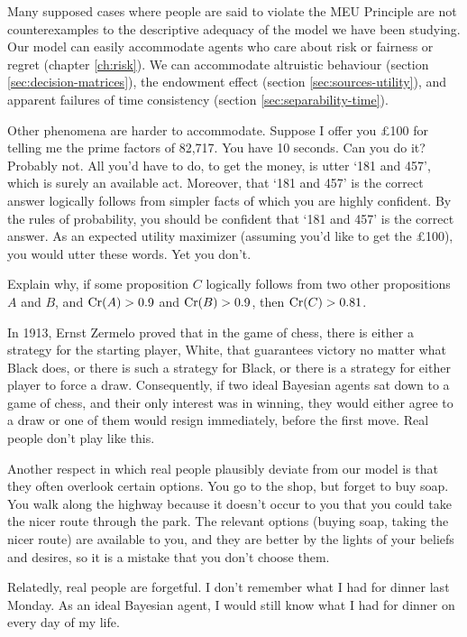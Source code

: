 Many supposed cases where people are said to violate the MEU Principle are not
counterexamples to the descriptive adequacy of the model we have been studying.
Our model can easily accommodate agents who care about risk or fairness or
regret (chapter \ref{ch:risk}). We can accommodate altruistic behaviour (section
\ref{sec:decision-matrices}), the endowment effect (section
\ref{sec:sources-utility}), and apparent failures of time consistency (section
\ref{sec:separability-time}).

Other phenomena are harder to accommodate. Suppose I offer you £100 for telling
me the prime factors of 82,717. You have 10 seconds. Can you do it? Probably
not. All you'd have to do, to get the money, is utter `181 and 457', which is
surely an available act. Moreover, that `181 and 457' is the correct answer
logically follows from simpler facts of which you are highly confident. By the
rules of probability, you should be confident that `181 and 457' is the correct
answer. As an expected utility maximizer (assuming you'd like to get the £100),
you would utter these words. Yet you don't.

\begin{exercise}{2}
  Explain why, if some proposition $C$ logically follows from two other
  propositions $A$ and $B$, and $\text{Cr}(A) > 0.9$ and $\text{Cr}(B) > 0.9$, then
  $\text{Cr}(C) > 0.81$.
\end{exercise}

In 1913, Ernst Zermelo proved that in the game of chess, there is either a
strategy for the starting player, White, that guarantees victory no matter what
Black does, or there is such a strategy for Black, or there is a strategy for
either player to force a draw. Consequently, if two ideal Bayesian agents sat
down to a game of chess, and their only interest was in winning, they would
either agree to a draw or one of them would resign immediately, before the first
move. Real people don't play like this.

Another respect in which real people plausibly deviate from our model is that
they often overlook certain options. You go to the shop, but forget to buy soap.
You walk along the highway because it doesn't occur to you that you could take
the nicer route through the park. The relevant options (buying soap, taking the
nicer route) are available to you, and they are better by the lights of your
beliefs and desires, so it is a mistake that you don't choose them.

Relatedly, real people are forgetful. I don't remember what I had for dinner
last Monday. As an ideal Bayesian agent, I would still know what I had for
dinner on every day of my life.

